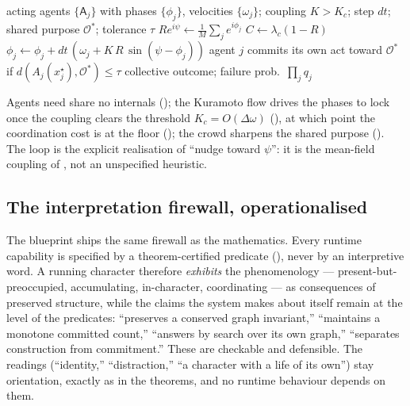 \documentclass[11pt,twocolumn,a4paper]{article}
\newcommand{\Agent}{\mathsf{A}}
\newcommand{\Purp}{x^{\star}}        %
\newcommand{\Ord}{R}                 %
\newcommand{\phase}{\phi}
\newcommand{\Out}{\mathcal{O}}       %
\newcommand{\tol}{\tau}
\newcommand{\dist}{d}
\begin{document}
\begin{algorithm}[H]
\caption{Phase-locking synchronisation for a shared purpose}
\label{alg:sync}
\begin{algorithmic}[1]
\Require acting agents $\{\Agent_j\}$ with phases $\{\phase_j\}$, velocities
$\{\omega_j\}$; coupling $K>K_c$; step $dt$; shared purpose $\Out^\ast$;
tolerance $\tol$
  \State $\Ord e^{i\psi}\gets\frac1M\sum_j e^{i\phase_j}$
  \State $C\gets\lambda_c(1-\Ord)$
    \State $\phase_j\gets\phase_j+dt\,(\omega_j+K\,\Ord\,\sin(\psi-\phase_j))$
  \EndFor
\EndWhile
  \State agent $j$ commits its own act toward $\Out^\ast$
    if $\dist(A_j(\Purp_j),\Out^\ast)\le\tol$
\EndFor
\State \Return collective outcome; failure prob.\ $\prod_j q_j$
\end{algorithmic}
\end{algorithm}

\noindent Agents need share no internals (); the Kuramoto
flow drives the phases to lock once the coupling clears the threshold
$K_c=O(\Delta\omega)$ (), at which point the
coordination cost is at the floor (); the crowd
sharpens the shared purpose (). The loop is the explicit
realisation of ``nudge toward $\psi$'': it is the mean-field coupling of
, not an unspecified heuristic.

\subsection{The interpretation firewall, operationalised}
\label{sec:firewall}

The blueprint ships the same firewall as the mathematics. Every runtime
capability is specified by a theorem-certified predicate
(), never by an
interpretive word. A running character therefore \emph{exhibits} the
phenomenology --- present-but-preoccupied, accumulating, in-character,
coordinating --- as consequences of preserved structure, while the claims
the system makes about itself remain at the level of the predicates:
``preserves a conserved graph invariant,'' ``maintains a monotone
committed count,'' ``answers by search over its own graph,'' ``separates
construction from commitment.'' These are checkable and defensible. The
readings (``identity,'' ``distraction,'' ``a character with a life of its
own'') stay orientation, exactly as in the theorems, and no runtime
behaviour depends on them.
\end{document}

